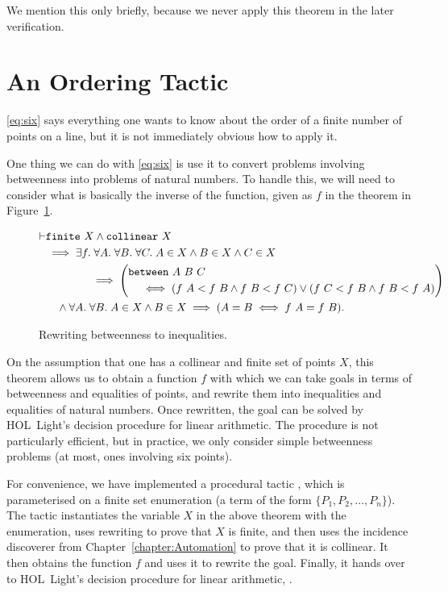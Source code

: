 We mention this only briefly, because we never apply this theorem in the later verification.

\section{An Ordering Tactic}
\ref{eq:six} says everything one wants to know about the order of a finite number of points on a line, but it is not immediately obvious how to apply it.

One thing we can do with \ref{eq:six} is use it to convert problems involving betweenness into problems of natural numbers. To handle this, we will need to consider what is basically the inverse of the  function, given as $f$ in the theorem in Figure~\ref{fig:sixInverse}.

\begin{figure}
\begin{equation*}
\begin{split}
  \vdash&\texttt{finite}\ X \wedge \texttt{collinear}\ X\\
  &\implies \exists f.\; \forall A.\;\forall B.\;\forall C.\;A \in X \wedge B \in X \wedge C \in X \\
  &\qquad\qquad\implies\left(\begin{aligned}&\texttt{between}\ A\ B\ C \\ &\quad
  \iff (f\ A < f\ B \wedge f\ B < f\ C) \vee (f\ C < f\ B \wedge f\ B < f\ A)\end{aligned}\right)\\
  &\quad\wedge \forall A.\;\forall B.\; A \in X \wedge B \in X \implies (A = B \iff f\ A = f\ B).
\end{split}
\end{equation*}
\caption{Rewriting betweenness to inequalities.}
\label{fig:sixInverse}
\end{figure}

On the assumption that one has a collinear and finite set of points $X$, this theorem allows us to obtain a function $f$ with which we can take goals in terms of betweenness and equalities of points, and rewrite them into inequalities and equalities of natural numbers. Once rewritten, the goal can be solved by HOL~Light's decision procedure for linear arithmetic. The procedure is not particularly efficient, but in practice, we only consider simple betweenness problems (at most, ones involving six points).

For convenience, we have implemented a procedural tactic , 
which is parameterised on a finite set enumeration (a term of the form $\{P_1,P_2,\ldots,P_n\}$). The tactic instantiates the variable $X$ in the above theorem with the enumeration, uses rewriting to prove that $X$ is finite, and then uses the incidence discoverer from Chapter~\ref{chapter:Automation} to prove that it is collinear. It then obtains the function $f$ and uses it to rewrite the goal. Finally, it hands over to HOL~Light's decision procedure for linear arithmetic, .

